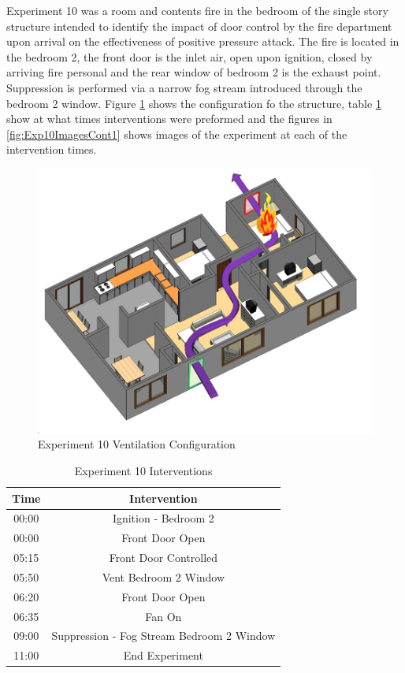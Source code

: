 \documentclass{article}
\begin{document}
Experiment 10 was a room and contents fire in the bedroom of the single story structure intended to identify the impact of door control by the fire department upon arrival on the effectiveness of positive pressure attack. The fire is located in the bedroom 2, the front door is the inlet air, open upon ignition, closed by arriving fire personal and the rear window of bedroom 2 is the exhaust point. Suppression is performed via a narrow fog stream introduced through the bedroom 2 window. Figure \ref{fig:Exp10VentConfig} shows the configuration fo the structure, table \ref{Table:Exp10Interventions} show at what times interventions were preformed and the figures in \ref{fig:Exp10ImagesCont1} shows images of the experiment at each of the intervention times.

\begin{figure}[h!]
	\centering
	\includegraphics[width=5in]{0_Images/FireExperiments/Single_Story/Experiment_10.jpg}
	\caption{Experiment 10 Ventilation Configuration}
	\label{fig:Exp10VentConfig}
\end{figure}

\begin{table}[H]
	\centering
	\caption{Experiment 10 Interventions}
	\begin{tabular}{|c|c|} 
		\hline
		Time & Intervention \\ \hline \hline
		00:00 & Ignition - Bedroom 2 \\ \hline
		00:00 & Front Door Open \\ \hline
		05:15 & Front Door Controlled \\ \hline
		05:50 & Vent Bedroom 2 Window\\ \hline
		06:20 & Front Door Open \\ \hline
		06:35 & Fan On \\ \hline
		09:00 & Suppression - Fog Stream Bedroom 2 Window\\ \hline
		11:00 & End Experiment\\ \hline
	\end{tabular}
	\label{Table:Exp10Interventions}
\end{table}
\end{document}
